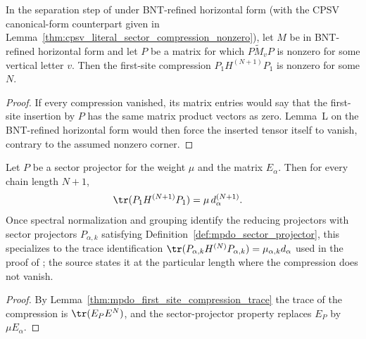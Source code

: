 \begin{lemma}
    \label{thm:mpdo_grouped_sector_compression_nonzero}
    \leanok
    In the separation step of
    \cite[Proposition~4.13, line 1898]{Cirac2016MPDO_arXiv} under
    BNT-refined horizontal form (with the CPSV canonical-form counterpart given
    in Lemma~\ref{thm:cpsv_literal_sector_compression_nonzero}), let $M$ be in
    BNT-refined horizontal form and let $P$ be a matrix for which
    $P\widetilde M_vP$ is nonzero for some vertical letter $v$. Then the
    first-site compression $P_1H^{(N+1)}P_1$ is nonzero for some $N$.
\end{lemma}

\begin{proof}\leanok
    If every compression vanished, its matrix entries would say that the
    first-site insertion by $P$ has the same matrix product vectors as zero.
    Lemma~L on the BNT-refined horizontal form would then force the
    inserted tensor itself to vanish, contrary to the assumed nonzero corner.
\end{proof}

\begin{lemma}
    \label{thm:mpdo_sector_trace_identity}
    \leanok
    Let $P$ be a sector projector for the weight $\mu$ and the matrix
    $E_\alpha$. Then for every chain length $N+1$,
    \begin{align}
        \tr(P_1H^{(N+1)}P_1)
         & =\mu\,d_\alpha^{(N+1)}.
        \label{eq:mpdo_sector_trace}
    \end{align}
    Once spectral normalization and grouping identify the reducing
    projectors with sector projectors $P_{\alpha,k}$ satisfying
    Definition~\ref{def:mpdo_sector_projector}, this specializes to the
    trace identification
    $\tr(P_{\alpha,k}H^{(N)}P_{\alpha,k})=\mu_{\alpha,k}d_\alpha$ used in
    the proof of \cite[Proposition~4.13]{Cirac2016MPDO_arXiv}; the source
    states it at the particular length where the compression does not vanish.
\end{lemma}

\begin{proof}\leanok
    By Lemma~\ref{thm:mpdo_first_site_compression_trace} the trace of the
    compression is $\tr(E_P E^N)$, and the sector-projector property
    replaces $E_P$ by $\mu E_\alpha$.
\end{proof}

